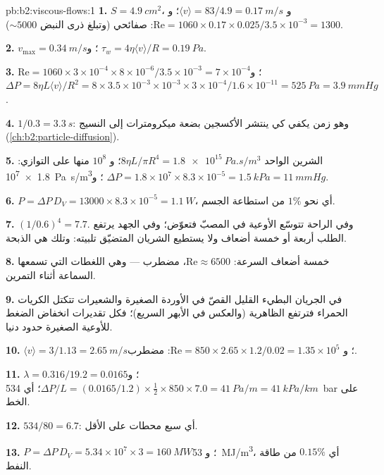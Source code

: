 \begin{solution}{pb:b2:viscous-flows:1}
\textbf{1.} $S = \qty{4.9}{cm^2}$، و $\langle v\rangle = 83/4.9 = \qty{0.17}{m/s}$؛ و $\mathrm{Re}
= 1060 \times 0.17 \times 0.025/3.5 \times 10^{-3} = 1300$: صفائحي (وتبلغ ذرى النبض
$\sim 5000$).

\textbf{2.} $v_{\max} = \qty{0.34}{m/s}$؛ و $\tau_w = 4\eta\langle v\rangle/R = \qty{0.19}{Pa}$.

\textbf{3.} $\mathrm{Re} = 1060 \times 3 \times 10^{-4} \times 8 \times 10^{-6}/3.5 \times 10^{-3} =
7 \times 10^{-4}$؛ و $\Delta P = 8\eta L\langle v\rangle/R^2 = 8 \times 3.5 \times 10^{-3} \times 10^{-3}
\times 3 \times 10^{-4}/1.6 \times 10^{-11} = \qty{525}{Pa} = \qty{3.9}{mmHg}$.

\textbf{4.} $1/0.3 = \qty{3.3}{s}$: وهو زمن يكفي كي ينتشر الأكسجين بضعة
ميكرومترات إلى النسيج (\cref{ch:b2:particle-diffusion}).

\textbf{5.} الشرين الواحد $8\eta L/\pi R^4 = \qty{1.8e15}{Pa.s/m^3}$؛ و $10^8$ منها
على التوازي: \qty{1.8e7}{Pa.s/m^3}؛ و $\Delta P = 1.8 \times 10^7 \times 8.3 \times 10^{-5} =
\qty{1.5}{kPa} = \qty{11}{mmHg}$.

\textbf{6.} $P = \Delta P\,D_V = 13000 \times 8.3 \times 10^{-5} = \qty{1.1}{W}$، أي نحو
$1\%$ من استطاعة الجسم.

\textbf{7.} $(1/0.6)^4 = 7.7$. وفي الراحة تتوسّع الأوعية في المصبّ
فتعوّض؛ وفي الجهد يرتفع الطلب أربعة أو خمسة أضعاف ولا يستطيع
الشريان المتضيّق تلبيته: وتلك هي الذبحة.

\textbf{8.} خمسة أضعاف السرعة: $\mathrm{Re} \approx 6500$، مضطرب --- وهي
اللغطات التي تسمعها السماعة أثناء التمرين.

\textbf{9.} في الجريان البطيء القليل القصّ في الأوردة الصغيرة
والشعيرات تتكتل الكريات الحمراء فترتفع  الظاهرية (والعكس
في الأبهر السريع)؛ فكل تقديرات انخفاض الضغط للأوعية الصغيرة
حدود دنيا.

\textbf{10.} $\langle v\rangle = 3/1.13 = \qty{2.65}{m/s}$؛ و $\mathrm{Re} = 850 \times 2.65 \times
1.2/0.02 = 1.35 \times 10^5$: مضطرب.

\textbf{11.} $\lambda = 0.316/19.2 = 0.0165$؛ و $\Delta P/L = (0.0165/1.2) \times \tfrac12 \times
850 \times 7.0 = \qty{41}{Pa/m} = \qty{41}{kPa/km}$؛ أي \qty{534}{bar} على الخط.

\textbf{12.} $534/80 = 6.7$: أي سبع محطات على الأقل.

\textbf{13.} $P = \Delta P\,D_V = 5.34 \times 10^7 \times 3 = \qty{160}{MW}$؛
و \qty{53}{MJ/m^3}، أي $0.15\%$ من طاقة النفط.


\end{solution}
